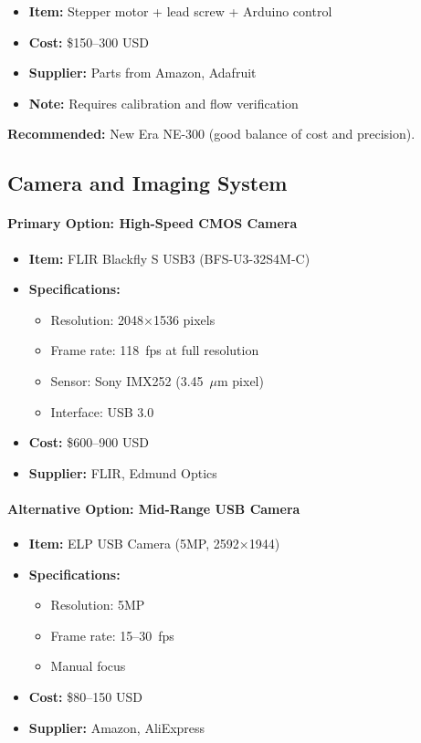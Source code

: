 \documentclass[11pt]{article}
\begin{document}
\begin{itemize}
\item \textbf{Item:} Stepper motor + lead screw + Arduino control
\item \textbf{Cost:} \$150--300 USD
\item \textbf{Supplier:} Parts from Amazon, Adafruit
\item \textbf{Note:} Requires calibration and flow verification
\end{itemize}

\textbf{Recommended:} New Era NE-300 (good balance of cost and precision).

\subsection{Camera and Imaging System}

\paragraph{Primary Option: High-Speed CMOS Camera}

\begin{itemize}
\item \textbf{Item:} FLIR Blackfly S USB3 (BFS-U3-32S4M-C)
\item \textbf{Specifications:}
  \begin{itemize}
  \item Resolution: 2048$\times$1536 pixels
  \item Frame rate: 118~fps at full resolution
  \item Sensor: Sony IMX252 (3.45~$\mu$m pixel)
  \item Interface: USB 3.0
  \end{itemize}
\item \textbf{Cost:} \$600--900 USD
\item \textbf{Supplier:} FLIR, Edmund Optics
\end{itemize}

\paragraph{Alternative Option: Mid-Range USB Camera}

\begin{itemize}
\item \textbf{Item:} ELP USB Camera (5MP, 2592$\times$1944)
\item \textbf{Specifications:}
  \begin{itemize}
  \item Resolution: 5MP
  \item Frame rate: 15--30~fps
  \item Manual focus
  \end{itemize}
\item \textbf{Cost:} \$80--150 USD
\item \textbf{Supplier:} Amazon, AliExpress
\end{itemize}
\end{document}
